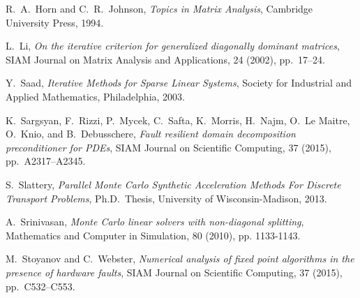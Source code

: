 \documentclass[final,leqno,onefignum,onetabnum]{siamltex1213}
\begin{document}
\begin{thebibliography}{9}
  {\sc R.~A.~Horn and C.~R.~Johnson},
  {\em Topics in Matrix Analysis},
  Cambridge University Press, 1994.
 
  {\sc L.~Li},
  {\em On the iterative criterion for generalized diagonally dominant 
matrices},
  SIAM Journal on Matrix Analysis and Applications,
  24 (2002), pp.~17--24.
 
 {\sc Y.~Saad}, 
 {\em Iterative Methods for Sparse Linear Systems},
 Society for Industrial and Applied Mathematics, Philadelphia, 2003.
  
  {\sc K.~Sargsyan, F.~Rizzi, P.~Mycek, C.~Safta, K.~Morris, H.~Najm,
  O.~Le Maitre, O.~Knio, and B.~Debusschere},
  {\em Fault resilient domain decomposition preconditioner for PDEs},
  SIAM Journal on Scientific Computing,
  37 (2015), pp.~A2317--A2345.
 
 {\sc S.~Slattery},
 {\em Parallel Monte Carlo Synthetic Acceleration Methods For Discrete 
Transport Problems},
 Ph.D.~Thesis, University of Wisconsin-Madison, 2013.
 
 {\sc A.~Srinivasan}, 
 {\em Monte Carlo linear solvers with non-diagonal splitting},
 Mathematics and Computer in Simulation,
 80 (2010), pp. 1133-1143.

 {\sc M.~Stoyanov and C.~Webster},
 {\em Numerical analysis of fixed point algorithms in the presence of hardware
  faults},
  SIAM Journal on Scientific Computing,
  37 (2015), pp.~C532--C553.
 
\end{thebibliography}
\end{document}
